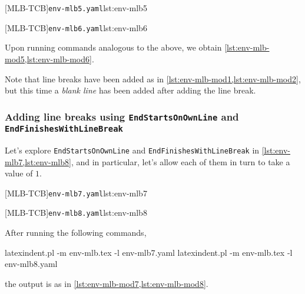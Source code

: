 	\begin{minipage}{.45\textwidth}
		[MLB-TCB]{\texttt{env-mlb5.yaml}}{lst:env-mlb5}
	\end{minipage}
	\hfill
	\begin{minipage}{.45\textwidth}
		[MLB-TCB]{\texttt{env-mlb6.yaml}}{lst:env-mlb6}
	\end{minipage}

	Upon running  commands analogous to the above, we obtain \cref{lst:env-mlb-mod5,lst:env-mlb-mod6}.

	\begin{widepage}
		\begin{minipage}{.56\linewidth}
		\end{minipage}
		\hfill
		\begin{minipage}{.43\linewidth}
		\end{minipage}
	\end{widepage}

	Note that line breaks have been added as in \cref{lst:env-mlb-mod1,lst:env-mlb-mod2}, but this time a \emph{blank line} has been added after adding the line break.

\subsubsection{Adding line breaks using \texttt{EndStartsOnOwnLine} and \texttt{EndFinishesWithLineBreak}}
	Let's explore \texttt{EndStartsOnOwnLine} and \texttt{EndFinishesWithLineBreak} in \cref{lst:env-mlb7,lst:env-mlb8}, and in particular, let's allow each of them in turn to take a value of $1$.

	\begin{minipage}{.49\textwidth}
		[MLB-TCB]{\texttt{env-mlb7.yaml}}{lst:env-mlb7}
	\end{minipage}
	\hfill
	\begin{minipage}{.49\textwidth}
		[MLB-TCB]{\texttt{env-mlb8.yaml}}{lst:env-mlb8}
	\end{minipage}

	After running the following commands, \begin{commandshell}
latexindent.pl -m env-mlb.tex -l env-mlb7.yaml
latexindent.pl -m env-mlb.tex -l env-mlb8.yaml
\end{commandshell} the output is as in \cref{lst:env-mlb-mod7,lst:env-mlb-mod8}.

